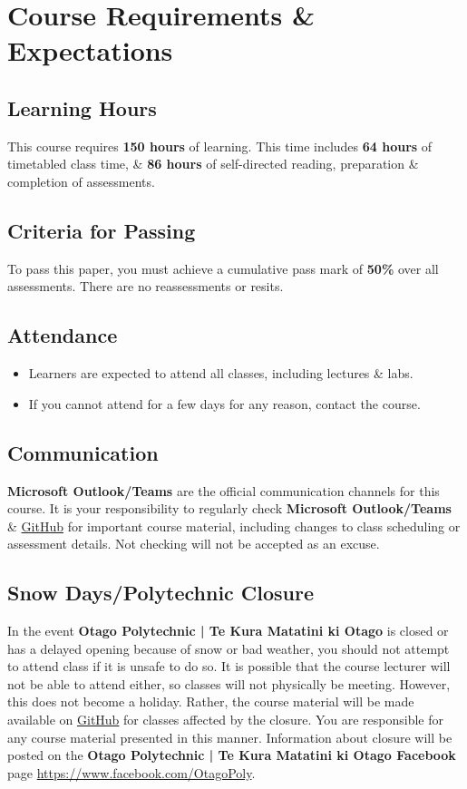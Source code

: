 \documentclass{article}
\begin{document}
\section*{Course Requirements \& Expectations}

\subsection*{Learning Hours}
This course requires \textbf{150 hours} of learning. This time includes \textbf{64 hours} of timetabled class time, \& \textbf{86 hours} of self-directed reading, preparation \& completion of assessments.

\subsection*{Criteria for Passing}
To pass this paper, you must achieve a cumulative pass mark of \textbf{50\%} over all assessments. There are no reassessments or resits.

\subsection*{Attendance}
\begin{itemize}
	\item Learners are expected to attend all classes, including lectures \& labs.
	\item If you cannot attend for a few days for any reason, contact the course.
\end{itemize}

\subsection*{Communication}
\textbf{Microsoft Outlook/Teams} are the official communication channels for this course. It is your responsibility to regularly check \textbf{Microsoft Outlook/Teams} \& \href{https://github.com/otago-polytechnic-bit-courses/ID607001-intro-app-dev-concepts}{GitHub} for important course material, including changes to class scheduling or assessment details. Not checking will not be accepted as an excuse.

\subsection*{Snow Days/Polytechnic Closure}
In the event \textbf{Otago Polytechnic | Te Kura Matatini ki Otago} is closed or has a delayed opening because of snow or bad weather, you should not attempt to attend class if it is unsafe to do so. It is possible that the course lecturer will not be able to attend either, so classes will not physically be meeting. However, this does not become a holiday. Rather, the course material will be made available on \href{https://github.com/otago-polytechnic-bit-courses/ID607001-intro-app-dev-concepts}{GitHub} for classes affected by the closure. You are responsible for any course material presented in this manner. Information about closure will be posted on the \textbf{Otago Polytechnic | Te Kura Matatini ki Otago Facebook} page \href{https://www.facebook.com/OtagoPoly}{https://www.facebook.com/OtagoPoly}.
\end{document}
